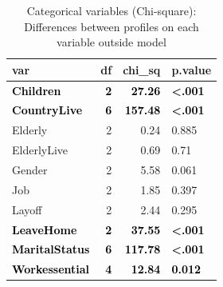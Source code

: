\documentclass[]{article}
\begin{document}
\begin{table}[H]

\caption{\label{tab:unnamed-chunk-19}Categorical variables (Chi-square): Differences between profiles on each variable outside model}
\centering
\fontsize{6}{8}\selectfont
\begin{tabular}[t]{lrrl}
\toprule
var & df & chi\_sq & p.value\\
\midrule
\textcolor{black}{\textbf{Children}} & \textcolor{black}{\textbf{2}} & \textcolor{black}{\textbf{27.26}} & \textcolor{black}{\textbf{<.001}}\\
\textcolor{black}{\textbf{CountryLive}} & \textcolor{black}{\textbf{6}} & \textcolor{black}{\textbf{157.48}} & \textcolor{black}{\textbf{<.001}}\\
Elderly & 2 & 0.24 & 0.885\\
ElderlyLive & 2 & 0.69 & 0.71\\
Gender & 2 & 5.58 & 0.061\\
\addlinespace
Job & 2 & 1.85 & 0.397\\
Layoff & 2 & 2.44 & 0.295\\
\textcolor{black}{\textbf{LeaveHome}} & \textcolor{black}{\textbf{2}} & \textcolor{black}{\textbf{37.55}} & \textcolor{black}{\textbf{<.001}}\\
\textcolor{black}{\textbf{MaritalStatus}} & \textcolor{black}{\textbf{6}} & \textcolor{black}{\textbf{117.78}} & \textcolor{black}{\textbf{<.001}}\\
\textcolor{black}{\textbf{Workessential}} & \textcolor{black}{\textbf{4}} & \textcolor{black}{\textbf{12.84}} & \textcolor{black}{\textbf{0.012}}\\
\bottomrule
\end{tabular}
\end{table}
\end{document}
